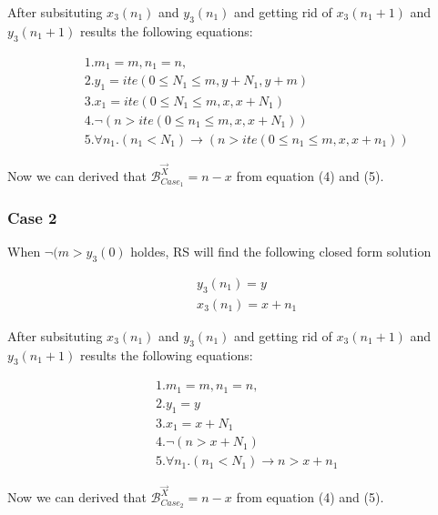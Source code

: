 After subsituting $x_3(n_1)$ and $y_3(n_1)$ and getting rid of $x_3(n_1+1)$ and $y_3(n_1+1)$ results the following equations:

\begin{eqnarray*}
	&&1.m_1 = m, n_1 = n,\\
	&&2.y_1 = ite(0\leq N_1 \leq m,y+N_1,y+m)\\
	&&3.x_1 = ite(0\leq N_1 \leq m,x,x+N_1)\\
	&&4.\neg (n>ite(0\leq n_1 \leq m,x,x+N_1))\\
	&&5.\forall n_1.(n_1<N_1) \rightarrow (n>ite(0\leq n_1 \leq m,x,x+n_1))
\end{eqnarray*}

Now we can derived that $\mathcal{B}^{\vec{X}}_{Case_1}=n-x$ from equation (4) and (5).

\subsubsection{Case 2} When $\neg (m>y_3(0)$ holdes, RS will find the following closed form solution

\begin{eqnarray*}
	&&y_3(n_1) = y\\ 
	&&x_3(n_1) = x+n_1
\end{eqnarray*}



After subsituting $x_3(n_1)$ and $y_3(n_1)$ and getting rid of $x_3(n_1+1)$ and $y_3(n_1+1)$ results the following equations:

\begin{eqnarray*}
	&&1.m_1 = m, n_1 = n,\\
	&&2.y_1 = y\\
	&&3.x_1 = x+N_1\\
	&&4.\neg (n>x+N_1)\\
	&&5.\forall n_1.(n_1<N_1) \rightarrow n>x+n_1
\end{eqnarray*}

Now we can derived that $\mathcal{B}^{\vec{X}}_{Case_2}=n-x$ from equation (4) and (5).
